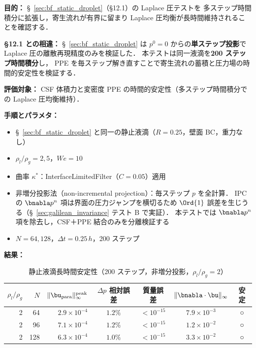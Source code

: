 \noindent\textbf{目的：}
§~\ref{sec:bf_static_droplet}（§12.1）の Laplace 圧テストを
多ステップ時間積分に拡張し，寄生流れが有界に留まり
Laplace 圧均衡が長時間維持されることを確認する．

\noindent\textbf{§12.1 との相違：}
§~\ref{sec:bf_static_droplet} は $p^0 = 0$ からの\textbf{単ステップ投影}で
Laplace 圧の離散再現精度のみを検証した．
本テストは同一液滴を\textbf{200 ステップ時間積分}し，
PPE を毎ステップ解き直すことで寄生流れの蓄積と圧力場の時間的安定性を検証する．

\noindent\textbf{評価対象：}
CSF 体積力と変密度 PPE の時間的安定性（多ステップ時間積分での Laplace 圧均衡維持）．

\noindent\textbf{手順とパラメタ：}
\begin{itemize}[noitemsep]
  \item §~\ref{sec:bf_static_droplet} と同一の静止液滴（$R = 0.25$，壁面 BC，重力なし）
  \item $\rho_l/\rho_g = 2, 5$，$\mathit{We} = 10$
  \item 曲率 $\kappa^*$：InterfaceLimitedFilter（$C = 0.05$）適用
  \item 非増分投影法（non-incremental projection）：毎ステップ $p$ を全計算．
        IPC の $\bnabla p^n$ 項は界面の圧力ジャンプを横切るため
        $\Ord{1}$ 誤差を生じうる（§~\ref{sec:galilean_invariance} テスト B で実証）．
        本テストでは $\bnabla p^n$ 項を除去し，CSF＋PPE 結合のみを分離検証する
  \item $N = 64, 128$，$\Delta t = 0.25\,h$，200 ステップ
\end{itemize}

\noindent\textbf{結果：}

\begin{table}[htbp]
\centering
\caption{静止液滴長時間安定性（200 ステップ，非増分投影，$\rho_l/\rho_g = 2$）\protect\footnotemark}
\label{tab:static_longterm}
\renewcommand{\arraystretch}{1.3}
\begin{tabular}{rrrcccc}
\toprule
$\rho_l/\rho_g$ & $N$ &
$\|\bu_{\mathrm{para}}\|_\infty^{\mathrm{peak}}$ &
$\Delta p$ 相対誤差 & 質量誤差 &
$\|\bnabla\cdot\bu\|_\infty$ & 安定 \\
\midrule
2 &  64 & $2.9 \times 10^{-4}$ & $1.2\%$ & $< 10^{-15}$ & $7.9 \times 10^{-3}$ & ○ \\
2 &  96 & $7.1 \times 10^{-4}$ & $1.2\%$ & $< 10^{-15}$ & $1.2 \times 10^{-2}$ & ○ \\
2 & 128 & $6.3 \times 10^{-4}$ & $1.0\%$ & $< 10^{-15}$ & $3.3 \times 10^{-2}$ & ○ \\
\bottomrule
\end{tabular}
\end{table}

